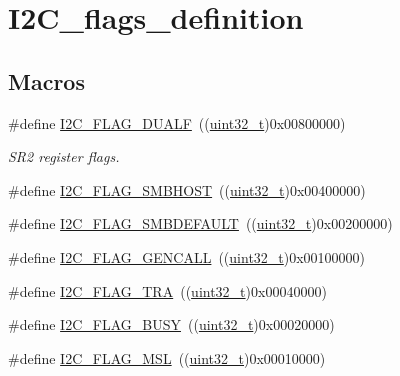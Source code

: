\hypertarget{group___i2_c__flags__definition}{}\section{I2\+C\+\_\+flags\+\_\+definition}
\label{group___i2_c__flags__definition}
\subsection*{Macros}
\begin{DoxyCompactItemize}
\item 
\#define \hyperlink{group___i2_c__flags__definition_ga3755b783aa73568659478c2e2e45e27f}{I2\+C\+\_\+\+F\+L\+A\+G\+\_\+\+D\+U\+A\+LF}~((\hyperlink{_p_e___types_8h_a33594304e786b158f3fb30289278f5af}{uint32\+\_\+t})0x00800000)
\begin{DoxyCompactList}\small\item\em S\+R2 register flags. \end{DoxyCompactList}\item 
\#define \hyperlink{group___i2_c__flags__definition_gaf15403a1852f39aaadbb8942ba98d97e}{I2\+C\+\_\+\+F\+L\+A\+G\+\_\+\+S\+M\+B\+H\+O\+ST}~((\hyperlink{_p_e___types_8h_a33594304e786b158f3fb30289278f5af}{uint32\+\_\+t})0x00400000)
\item 
\#define \hyperlink{group___i2_c__flags__definition_ga371fb29861d1cd41736253e804c67ad5}{I2\+C\+\_\+\+F\+L\+A\+G\+\_\+\+S\+M\+B\+D\+E\+F\+A\+U\+LT}~((\hyperlink{_p_e___types_8h_a33594304e786b158f3fb30289278f5af}{uint32\+\_\+t})0x00200000)
\item 
\#define \hyperlink{group___i2_c__flags__definition_gab3a93b6840ad406c2fc09e0e96c59b88}{I2\+C\+\_\+\+F\+L\+A\+G\+\_\+\+G\+E\+N\+C\+A\+LL}~((\hyperlink{_p_e___types_8h_a33594304e786b158f3fb30289278f5af}{uint32\+\_\+t})0x00100000)
\item 
\#define \hyperlink{group___i2_c__flags__definition_ga0359a5f960670d51cb17e659d32498ea}{I2\+C\+\_\+\+F\+L\+A\+G\+\_\+\+T\+RA}~((\hyperlink{_p_e___types_8h_a33594304e786b158f3fb30289278f5af}{uint32\+\_\+t})0x00040000)
\item 
\#define \hyperlink{group___i2_c__flags__definition_ga50f69f043d99600221076100823b6ff3}{I2\+C\+\_\+\+F\+L\+A\+G\+\_\+\+B\+U\+SY}~((\hyperlink{_p_e___types_8h_a33594304e786b158f3fb30289278f5af}{uint32\+\_\+t})0x00020000)
\item 
\#define \hyperlink{group___i2_c__flags__definition_gae8e6a404cbfd70420d278d520304f368}{I2\+C\+\_\+\+F\+L\+A\+G\+\_\+\+M\+SL}~((\hyperlink{_p_e___types_8h_a33594304e786b158f3fb30289278f5af}{uint32\+\_\+t})0x00010000)

\end{DoxyCompactItemize}
